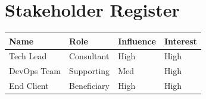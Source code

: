 \documentclass[
]{report}
\author{}
\date{}
\newcounter{none} %
\begin{document}
\newcommand{\theProjectName}{NOAA}
\newcommand{\theAuthor}{Rodrigo Souza dos Santos}

\chapter{Stakeholder Register}\label{stakeholder-register}

{\def\LTcaptype{none} %
\begin{longtable}[]{@{}llll@{}}
\toprule\noalign{}
Name & Role & Influence & Interest \\
\midrule\noalign{}
\endhead
\bottomrule\noalign{}
\endlastfoot
Tech Lead & Consultant & High & High \\
DevOps Team & Supporting & Med & High \\
End Client & Beneficiary & High & High \\
\end{longtable}
}
\end{document}
